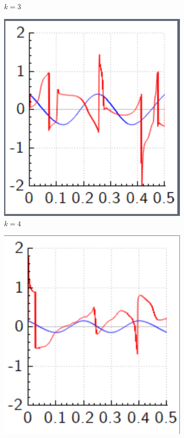 \documentclass[a4paper, twocolumn]{revtex4-1}
\begin{document}
\begin{figure}
\begin{subfigure}{0.4\columnwidth}
		\caption{$k=3$}
	\end{subfigure}
	\begin{subfigure}{0.4\columnwidth}
		\includegraphics[width=\columnwidth]{graphics/similar_solutions/k4.PNG}
		\caption{$k=4$}
	\end{subfigure}
	\begin{subfigure}{0.4\columnwidth}
		\includegraphics[width=\columnwidth]{graphics/similar_solutions/k5.PNG}

\end{subfigure}
\end{figure}
\end{document}
